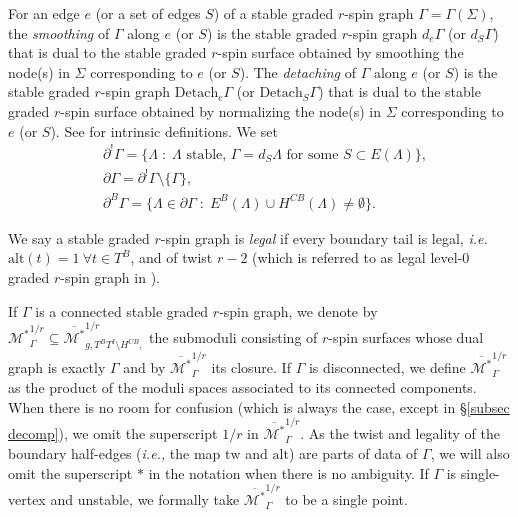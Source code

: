\documentclass[11pt]{amsart}
\theoremstyle{definition}
\theoremstyle{remark}
\newcommand{\alt}{{\text{alt}}}
\newcommand{\tw}{\text{tw}}
\newcommand{\<}{\left<}
\renewcommand{\>}{\right>}
\numberwithin{equation}{section}
\def\Mbarstar{{\overline{\mathcal M^*}}}
\begin{document}
For an edge $e$ (or a set of edges $S$) of a stable graded $r$-spin graph $\Gamma=\Gamma(\Sigma)$,  the \textit{smoothing} of $\Gamma$ along $e$ (or $S$) is the stable graded $r$-spin graph $d_e\Gamma$ (or $d_S \Gamma$) that is dual to the stable graded $r$-spin surface obtained by smoothing the node(s) in $\Sigma$ corresponding to $e$ (or $S$). The \textit{detaching} of $\Gamma$ along $e$ (or $S$) is the stable graded $r$-spin graph $\text{Detach}_e\Gamma$ (or $\text{Detach}_S\Gamma$) that is dual to the stable graded $r$-spin surface obtained by normalizing the node(s) in $\Sigma$ corresponding to $e$ (or $S$). See \cite[\S 3.2]{TZ1} for intrinsic definitions. We set
\begin{align*}
&\partial^!\Gamma = \{\Lambda \; \colon \; \Lambda \text{ stable, }\Gamma= d_S\Lambda \text{ for some } S\subset E(\Lambda)\},\\
&\partial \Gamma = \partial^!\Gamma \setminus \{\Gamma\},\\
&\partial^B \Gamma = \{\Lambda \in \partial \Gamma \; \colon \; E^B(\Lambda) \cup H^{CB}(\Lambda) \neq \emptyset\}.
\end{align*}


We say a stable graded $r$-spin graph is \textit{legal} if every boundary tail is legal, \textit{i.e.} ${\text{alt}}(t)=1~\forall t \in T^B$, and of twist $r-2$ (which is referred to as legal level-$0$ graded $r$-spin graph in \cite{BCT2}). 

 If $\Gamma$ is a connected stable graded $r$-spin graph, we denote by %
${\mathcal M^*}_{\Gamma}^{1/r}\subseteq {\Mbarstar}_{g,  T^B T^I\setminus H^{CB},}^{1/r}$ the %
submoduli consisting of $r$-spin surfaces whose dual graph is %
exactly $\Gamma$ and %
by $\overline{{\mathcal M^*}}_{\Gamma}^{1/r}$ its closure. If $\Gamma$ is disconnected, we define $\Mbarstar_{\Gamma}^{1/r}$ as the product of the moduli spaces associated to its connected components. When there is no room for confusion (which is always the case, except in \S \ref{subsec decomp}), we omit the superscript $1/r$ in $\overline{{\mathcal M^*}}_{\Gamma}^{1/r}$. 
 As the twist and legality of the boundary half-edges %
(\textit{i.e.,} the %
map $\tw$ and $\alt$) are parts of data of $\Gamma$, we will also omit the superscript $*$ in the notation when there is no ambiguity.
 If $\Gamma$ is single-vertex and unstable, we formally take $\Mbarstar^{1/r}_{\Gamma}$ to be a single point.
\end{document}
